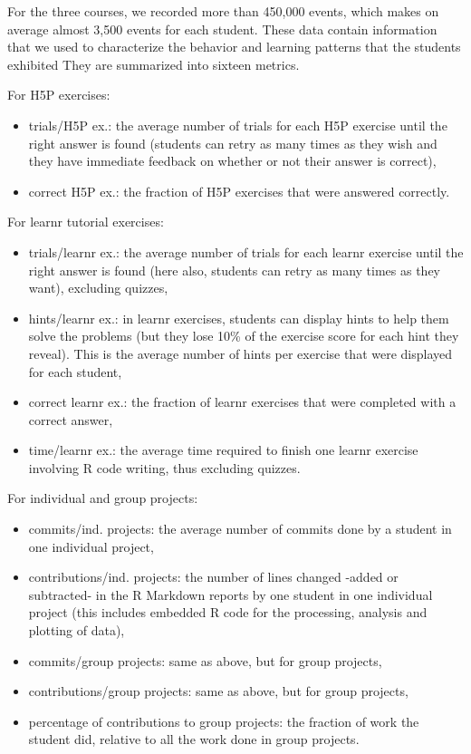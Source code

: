 \documentclass{aims}
\theoremstyle{definition}
\begin{document}
For the three courses, we recorded more than 450,000 events, which makes
on average almost 3,500 events for each student. These data contain
information that we used to characterize the behavior and learning
patterns that the students exhibited They are summarized into sixteen
metrics.

For H5P exercises:

\begin{itemize}
\item
  trials/H5P ex.: the average number of trials for each H5P exercise
  until the right answer is found (students can retry as many times as
  they wish and they have immediate feedback on whether or not their
  answer is correct),
\item
  correct H5P ex.: the fraction of H5P exercises that were answered
  correctly.
\end{itemize}

For learnr tutorial exercises:

\begin{itemize}
\item
  trials/learnr ex.: the average number of trials for each learnr
  exercise until the right answer is found (here also, students can
  retry as many times as they want), excluding quizzes,
\item
  hints/learnr ex.: in learnr exercises, students can display hints to
  help them solve the problems (but they lose 10\% of the exercise score
  for each hint they reveal). This is the average number of hints per
  exercise that were displayed for each student,
\item
  correct learnr ex.: the fraction of learnr exercises that were
  completed with a correct answer,
\item
  time/learnr ex.: the average time required to finish one learnr
  exercise involving R code writing, thus excluding quizzes.
\end{itemize}

For individual and group projects:

\begin{itemize}
\item
  commits/ind. projects: the average number of commits done by a student
  in one individual project,
\item
  contributions/ind. projects: the number of lines changed -added or
  subtracted- in the R Markdown reports by one student in one individual
  project (this includes embedded R code for the processing, analysis
  and plotting of data),
\item
  commits/group projects: same as above, but for group projects,
\item
  contributions/group projects: same as above, but for group projects,
\item
  percentage of contributions to group projects: the fraction of work
  the student did, relative to all the work done in group projects.
\end{itemize}
\end{document}
